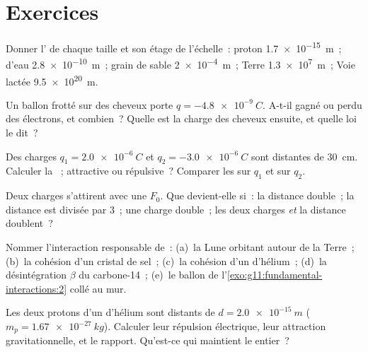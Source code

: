 \section{Exercices}

\begin{exercise}[$\star$]\label{exo:g11:fundamental-interactions:1}
Donner l' de chaque taille et
son étage de l'échelle~: proton \qty{1.7e-15}{m}~;
 d'eau \qty{2.8e-10}{m}~; grain de
sable \qty{2e-4}{m}~; Terre \qty{1.3e7}{m}~; Voie lactée \qty{9.5e20}{m}.
\end{exercise}

\begin{exercise}[$\star$]\label{exo:g11:fundamental-interactions:2}
Un ballon frotté sur des cheveux porte $q = \qty{-4.8e-9}{C}$. A-t-il
gagné ou perdu des électrons, et combien~? Quelle est la charge des
cheveux ensuite, et quelle loi le dit~?
\end{exercise}

\begin{exercise}[$\star$]\label{exo:g11:fundamental-interactions:3}
Des charges $q_1 = \qty{+2.0e-6}{C}$ et $q_2 = \qty{-3.0e-6}{C}$ sont
distantes de \qty{30}{cm}. Calculer la
~; attractive ou répulsive~?
Comparer les  sur $q_1$ et sur $q_2$.
\end{exercise}

\begin{exercise}[$\star$]\label{exo:g11:fundamental-interactions:4}
Deux charges s'attirent avec une  $F_0$.
Que devient-elle si~: la distance double~; la distance est divisée par
$3$~; une charge double~; les deux charges \emph{et} la distance
doublent~?
\end{exercise}

\begin{exercise}[$\star$]\label{exo:g11:fundamental-interactions:5}
Nommer l'interaction responsable de~: (a)~la Lune orbitant autour de la
Terre~; (b)~la cohésion d'un cristal de sel~; (c)~la cohésion d'un
 d'hélium~; (d)~la désintégration
$\beta$ du carbone-14~; (e)~le ballon de
l'\cref{exo:g11:fundamental-interactions:2} collé au mur.
\end{exercise}

\begin{exercise}[$\star\star$]\label{exo:g11:fundamental-interactions:6}
Les deux protons d'un  d'hélium sont
distants de $d = \qty{2.0e-15}{m}$ ($m_p = \qty{1.67e-27}{kg}$). Calculer
leur répulsion électrique, leur attraction gravitationnelle, et le
rapport. Qu'est-ce qui maintient le
 entier~?
\end{exercise}

